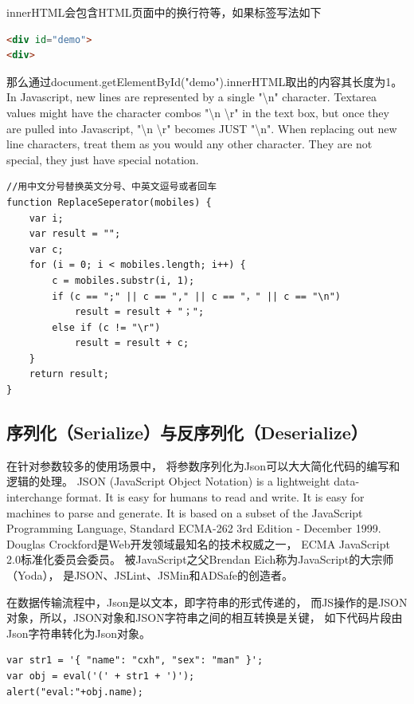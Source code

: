 \documentclass{book}
\begin{document}
innerHTML会包含HTML页面中的换行符等，如果标签写法如下

\begin{lstlisting}[language=HTML]
<div id="demo">
<div>
\end{lstlisting}

那么通过document.getElementById("demo").innerHTML取出的内容其长度为1。
In Javascript, new lines are represented by a single "\textbackslash n" character.
Textarea values might have the character combos "\textbackslash n \textbackslash r" in the text box, but once they are pulled into Javascript,
 "\textbackslash n \textbackslash r" becomes JUST "\textbackslash n".
When replacing out new line characters, treat them as you would any other character. 
They are not special, they just have special notation.

\begin{lstlisting}[language=VBScript]
//用中文分号替换英文分号、中英文逗号或者回车
function ReplaceSeperator(mobiles) {
    var i;
    var result = "";
    var c;
    for (i = 0; i < mobiles.length; i++) {
        c = mobiles.substr(i, 1);
        if (c == ";" || c == "," || c == "，" || c == "\n")
            result = result + "；";
        else if (c != "\r")
            result = result + c;
    }
    return result;
}
\end{lstlisting}

\subsection{序列化（Serialize）与反序列化（Deserialize）}

在针对参数较多的使用场景中，
将参数序列化为Json可以大大简化代码的编写和逻辑的处理。
JSON (JavaScript Object Notation) is a lightweight data-interchange format. 
It is easy for humans to read and write. It is easy for machines to parse and generate. 
It is based on a subset of the JavaScript Programming Language, 
Standard ECMA-262 3rd Edition - December 1999.
Douglas Crockford是Web开发领域最知名的技术权威之一，
ECMA JavaScript 2.0标准化委员会委员。
被JavaScript之父Brendan Eich称为JavaScript的大宗师（Yoda），
是JSON、JSLint、JSMin和ADSafe的创造者。

在数据传输流程中，Json是以文本，即字符串的形式传递的，
而JS操作的是JSON对象，所以，JSON对象和JSON字符串之间的相互转换是关键，
如下代码片段由Json字符串转化为Json对象。

\begin{lstlisting}[language=VBScript]
var str1 = '{ "name": "cxh", "sex": "man" }';
var obj = eval('(' + str1 + ')');
alert("eval:"+obj.name);
\end{lstlisting}
\end{document}
